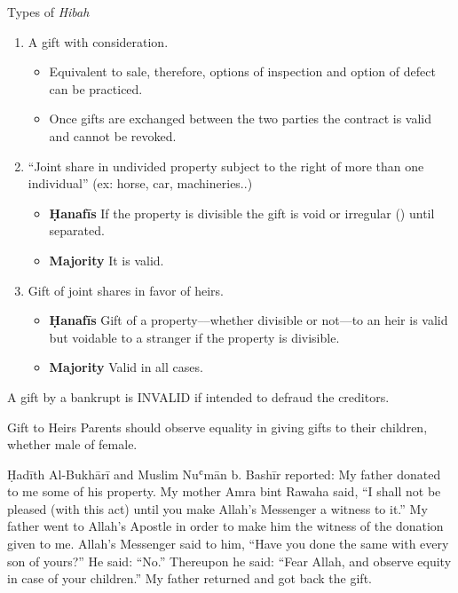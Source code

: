 \begin{frame}{Types of \textit{Hibah} \hfill {}}
\begin{enumerate}
\item {} A gift with consideration.
\begin{itemize}
\item Equivalent to sale, therefore, options of inspection and option of defect can be practiced.  
\item Once gifts are exchanged between the two parties the contract is valid and cannot be revoked.
\end{itemize}
\item {} “Joint share in undivided property subject to the right of more than one individual” (ex: horse, car, machineries..)
\begin{itemize}
\item \textbf{Ḥanafīs} If the property is divisible the gift is void or irregular () until separated.
\item \textbf{Majority} It is valid.
\end{itemize}
\end{enumerate}
\end{frame}

\begin{frame}
\begin{enumerate}
  \setcounter{enumi}{2}
\item Gift of joint shares in favor of heirs.
\begin{itemize}
\item \textbf{Ḥanafīs} Gift of a property--–whether divisible or not---to an heir is valid but voidable to a stranger if the property is divisible.
\item \textbf{Majority} Valid in all cases.
\end{itemize}
\end{enumerate}
\end{frame}

\begin{frame}[standout]
A gift by a bankrupt is \alert{INVALID} if intended to defraud the creditors.
\end{frame}

\begin{frame}{Gift to Heirs}
Parents should observe equality in giving gifts to their children, whether male of female.
\begin{block}{Ḥadīth \hfill Al-Bukhārī and Muslim}
Nuʿmān b. Bashīr reported: My father donated to me some of his property. My mother Amra bint Rawaha said, “I shall not be pleased (with this act) until you make Allah's Messenger \pbuh a witness to it.” My father went to Allah's Apostle \pbuh in order to make him the witness of the donation given to me. Allah's Messenger \pbuh said to him, “Have you done the same with every son of yours?” He said: “No.” Thereupon he \pbuh said: “Fear Allah, and observe equity in case of your children.” My father returned and got back the gift.
\end{block}
\end{frame}

